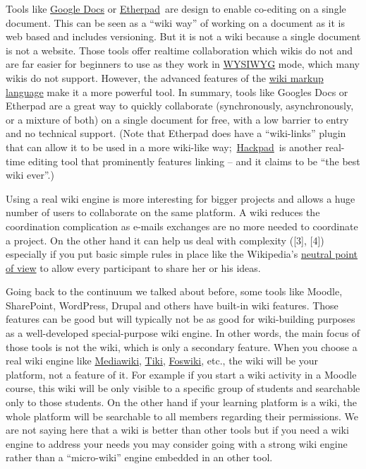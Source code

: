 Tools like \href{https://docs.google.com/}{Google Docs} or
\href{http://en.wikipedia.org/wiki/Etherpad}{Etherpad}~are design to
enable co-editing on a single document. This can be seen as a ``wiki
way'' of working on a document as it is web based and includes
versioning. But it is not a wiki because a single document is not a
website. Those tools offer realtime collaboration which wikis do not and
are far easier for beginners to use as they work in
\href{http://en.wikipedia.org/wiki/WYSIWYG}{WYSIWYG} mode, which many
wikis do not support. However, the advanced features of the
\href{http://en.wikipedia.org/wiki/Wiki_syntax}{wiki markup language}
make it a more powerful tool. In summary, tools like Googles Docs or
Etherpad are a great way to quickly collaborate (synchronously,
asynchronously, or a mixture of both) on a single document for free,
with a low barrier to entry and no technical support. (Note that
Etherpad does have a ``wiki-links'' plugin that can allow it to be used
in a more wiki-like way;~\href{https://hackpad.com/}{Hackpad}~is another
real-time editing tool that prominently features linking -- and it
claims to be ``the best wiki ever''.)

Using a real wiki engine is more interesting for bigger projects and
allows a huge number of users to collaborate on the same platform. A
wiki reduces the coordination complication as e-mails exchanges are no
more needed to coordinate a project. On the other hand it can help us
deal with complexity ({{[}3{]}}, {{[}4{]}}) especially if you put basic
simple rules in place like the Wikipedia's
\href{http://en.wikipedia.org/wiki/NPOV}{neutral point of view} to allow
every participant to share her or his ideas.

Going back to the continuum we talked about before, some tools like
Moodle, SharePoint, WordPress, Drupal and others have built-in wiki
features. Those features can be good but will typically not be as good
for wiki-building purposes as a well-developed special-purpose wiki
engine. In other words, the main focus of those tools is not the wiki,
which is only a secondary feature. When you choose a real wiki engine
like \href{http://www.mediawiki.org/}{Mediawiki},
\href{http://www.tiki.org/}{Tiki}, \href{http://foswiki.org/}{Foswiki},
etc., the wiki will be your platform, not a feature of it. For example
if you start a wiki activity in a Moodle course, this wiki will be only
visible to a specific group of students and searchable only to those
students. On the other hand if your learning platform is a wiki, the
whole platform will be searchable to all members regarding their
permissions. We are not saying here that a wiki is better than other
tools but if you need a wiki engine to address your needs you may
consider going with a strong wiki engine rather than a ``micro-wiki''
engine embedded in an other tool.

